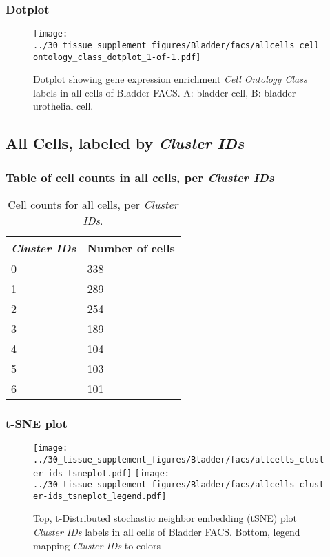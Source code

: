 \clearpage

\subsubsection{Dotplot}
\begin{figure}[h]
\centering
\texttt{[image: ../30\_tissue\_supplement\_figures/Bladder/facs/allcells\_cell\_ontology\_class\_dotplot\_1-of-1.pdf]}

\caption{ Dotplot  showing gene expression enrichment \emph{Cell Ontology Class} labels in all cells of Bladder FACS. A: bladder cell, B: bladder urothelial cell.}
\end{figure}


\clearpage

\subsection{All Cells, labeled by \emph{Cluster IDs}}
\subsubsection{Table of cell counts in all cells, per \emph{Cluster IDs}}\begin{table}[h]
\centering
\label{my-label}
\begin{tabular}{@{}ll@{}}
\toprule

\emph{Cluster IDs}& Number of cells \\ \midrule
0 & 338 \\

1 & 289 \\

2 & 254 \\

3 & 189 \\

4 & 104 \\

5 & 103 \\

6 & 101 \\
\bottomrule
\end{tabular}
\caption{Cell counts for all cells, per \emph{Cluster IDs}.}
\end{table}

\clearpage
\subsubsection{t-SNE plot}
\begin{figure}[h]
\centering
\texttt{[image: ../30\_tissue\_supplement\_figures/Bladder/facs/allcells\_cluster-ids\_tsneplot.pdf]}
\texttt{[image: ../30\_tissue\_supplement\_figures/Bladder/facs/allcells\_cluster-ids\_tsneplot\_legend.pdf]}
\caption{Top, t-Distributed stochastic neighbor embedding (tSNE) plot  \emph{Cluster IDs} labels in all cells of Bladder FACS. Bottom, legend mapping \emph{Cluster IDs} to colors}
\end{figure}


